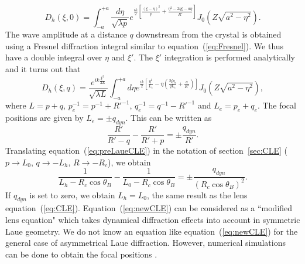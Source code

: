 \documentclass[preprint]{iucr}              %
\newcommand{\inred}[1]{{\color{red}#1}}
\begin{document}
\begin{equation}\label{eq:blabla}
    D_h(\xi,0)=\int_{-a}^{+a}\frac{d\eta}{\sqrt{\lambda p}}
    e^{\frac{ik}{2}\left[\frac{(\xi-\eta)^2}{p}+\frac{\eta^2-2\eta\xi-a\eta}{R'}\right]}
    J_0(Z\sqrt{a^2-\eta^2}).
\end{equation}
The wave amplitude at a distance $q$ downstream from the crystal is obtained using \inred{a Fresnel diffraction integral similar to} equation~(\ref{eq:Fresnel}). We thus have a double integral over $\eta$ and $\xi'$. The $\xi'$ integration \inred{is} performed analytically \cite{GuigayFerrero2013} and it turns out that
\begin{equation}
\label{eq:Dhpropagated}
    D_h(\xi,q)=
    \frac{e^{i k \frac{\xi^2}{2L}}}{\sqrt{\lambda L}}
    \int_{-a}^{+a} d\eta
    e^{\frac{ik}{2}
    [\frac{\eta^2}{L_e}-\eta(
    \frac{2\xi q_e}{q L_e}+
    \frac{a}{R'}
    )]}
    J_0(Z\sqrt{a^2-\eta^2}),
\end{equation}
where $L=p+q$, $p_e^{-1}=p^{-1}+R'^{-1}$, $q_e^{-1}=q^{-1}-R'^{-1}$ and $L_e=p_e+q_e$. The focal positions are given by $L_{e}=\pm q_{dyn}$.
This can be written as
\begin{equation}
\label{eq:preLaueCLE}
    \frac{R'}{R'-q} - \frac{R'}{R' + p} = \pm \frac{q_{dyn}}{R'}.
\end{equation}
Translating equation~(\ref{eq:preLaueCLE}) in the notation of section~\ref{sec:CLE} ($p \to L_0$, $q \to -L_h$, $R \to -R_c$), we obtain
\begin{equation}
\label{eq:newCLE}
    \frac{1}{L_h-R_c \cos\theta_B} -
    \frac{1}{L_0 - R_c \cos\theta_B} =
    \pm \frac{q_{dyn}}{(R_c \cos\theta_B)^2}.
\end{equation}
If $q_{dyn}$ is set to zero, we obtain $L_h=L_0$, the same result as the lens equation~(\ref{eq:CLE}).
Equation~(\ref{eq:newCLE}) can be considered as a ``modified lens equation" which takes dynamical diffraction effects into account in symmetric Laue geometry.
We \inred{do not know an equation} like equation~(\ref{eq:newCLE}) for the general case of asymmetrical Laue diffraction. However, numerical simulations can be done to obtain the focal positions \cite{Nesterets,GuigayFerrero2016}.
\end{document}
